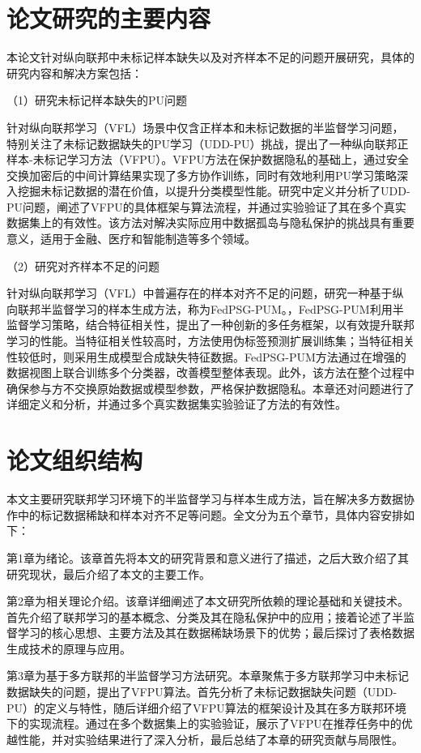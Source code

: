 \section{论文研究的主要内容}
本论文针对纵向联邦中未标记样本缺失以及对齐样本不足的问题开展研究，具体的研究内容和解决方案包括：

（1）研究未标记样本缺失的PU问题

针对纵向联邦学习（VFL）场景中仅含正样本和未标记数据的半监督学习问题，特别关注了未标记数据缺失的PU学习（UDD-PU）挑战，提出了一种纵向联邦正样本-未标记学习方法（VFPU）。VFPU方法在保护数据隐私的基础上，通过安全交换加密后的中间计算结果实现了多方协作训练，同时有效地利用PU学习策略深入挖掘未标记数据的潜在价值，以提升分类模型性能。研究中定义并分析了UDD-PU问题，阐述了VFPU的具体框架与算法流程，并通过实验验证了其在多个真实数据集上的有效性。该方法对解决实际应用中数据孤岛与隐私保护的挑战具有重要意义，适用于金融、医疗和智能制造等多个领域。

（2）研究对齐样本不足的问题

针对纵向联邦学习（VFL）中普遍存在的样本对齐不足的问题，研究一种基于纵向联邦半监督学习的样本生成方法，称为FedPSG-PUM。，FedPSG-PUM利用半监督学习策略，结合特征相关性，提出了一种创新的多任务框架，以有效提升联邦学习的性能。当特征相关性较高时，方法使用伪标签预测扩展训练集；当特征相关性较低时，则采用生成模型合成缺失特征数据。FedPSG-PUM方法通过在增强的数据视图上联合训练多个分类器，改善模型整体表现。此外，该方法在整个过程中确保参与方不交换原始数据或模型参数，严格保护数据隐私。本章还对问题进行了详细定义和分析，并通过多个真实数据集实验验证了方法的有效性。

\section{论文组织结构}
本文主要研究联邦学习环境下的半监督学习与样本生成方法，旨在解决多方数据协作中的标记数据稀缺和样本对齐不足等问题。全文分为五个章节，具体内容安排如下：


第1章为绪论。该章首先将本文的研究背景和意义进行了描述，之后大致介绍了其研究现状，最后介绍了本文的主要工作。

第2章为相关理论介绍。该章详细阐述了本文研究所依赖的理论基础和关键技术。首先介绍了联邦学习的基本概念、分类及其在隐私保护中的应用；接着论述了半监督学习的核心思想、主要方法及其在数据稀缺场景下的优势；最后探讨了表格数据生成技术的原理与应用。

第3章为基于多方联邦的半监督学习方法研究。本章聚焦于多方联邦学习中未标记数据缺失的问题，提出了VFPU算法。首先分析了未标记数据缺失问题（UDD-PU）的定义与特性，随后详细介绍了VFPU算法的框架设计及其在多方联邦环境下的实现流程。通过在多个数据集上的实验验证，展示了VFPU在推荐任务中的优越性能，并对实验结果进行了深入分析，最后总结了本章的研究贡献与局限性。

